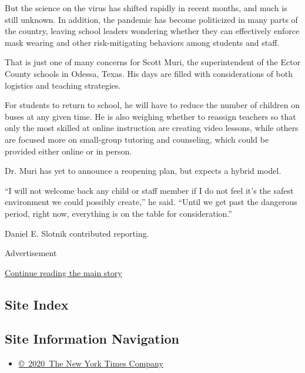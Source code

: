 But the science on the virus has shifted rapidly in recent months, and
much is still unknown. In addition, the pandemic has become politicized
in many parts of the country, leaving school leaders wondering whether
they can effectively enforce mask wearing and other risk-mitigating
behaviors among students and staff.

That is just one of many concerns for Scott Muri, the superintendent of
the Ector County schools in Odessa, Texas. His days are filled with
considerations of both logistics and teaching strategies.

For students to return to school, he will have to reduce the number of
children on buses at any given time. He is also weighing whether to
reassign teachers so that only the most skilled at online instruction
are creating video lessons, while others are focused more on small-group
tutoring and counseling, which could be provided either online or in
person.

Dr. Muri has yet to announce a reopening plan, but expects a hybrid
model.

``I will not welcome back any child or staff member if I do not feel
it's the safest environment we could possibly create,'' he said. ``Until
we get past the dangerous period, right now, everything is on the table
for consideration.''

Daniel E. Slotnik contributed reporting.

Advertisement

\protect\hyperlink{after-bottom}{Continue reading the main story}

\hypertarget{site-index}{%
\subsection{Site Index}\label{site-index}}

\hypertarget{site-information-navigation}{%
\subsection{Site Information
Navigation}\label{site-information-navigation}}

\begin{itemize}
\tightlist
\item
  \href{https://help.nytimes3xbfgragh.onion/hc/en-us/articles/115014792127-Copyright-notice}{©~2020~The
  New York Times Company}
\end{itemize}

